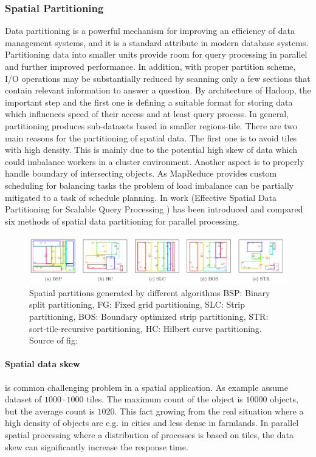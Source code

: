 \documentclass[a4paper,12pt,oneside]{report}
\begin{document}
		\subsubsection{Spatial Partitioning}
		\label{Spatial_Data_Partitioning}
Data partitioning is a powerful mechanism for improving an efficiency of data management systems, 
and it is a standard attribute in modern database systems. Partitioning data into smaller units provide room for query processing in parallel and further improved performance. In addition,
with proper partition scheme, I/O operations may be substantially
reduced by scanning only a few sections that contain relevant information to answer a question.
By architecture of Hadoop, the important step and the first one is defining a suitable format for 
storing data which influences  speed of their access and at least query process. In general,
partitioning produces sub-datasets based in smaller regions-tile.
There are two main reasons for the partitioning of spatial data. 
The first one is to avoid tiles with high density. This is mainly due to the potential high 
skew\cite{spatial_skew} of data which could imbalance workers in a cluster environment. Another aspect is to  
properly handle boundary of intersecting objects. As MapReduce provides custom
scheduling  for balancing tasks the problem of load imbalance can be partially 
mitigated to a task of schedule planning. In work (Effective Spatial Data Partitioning for Scalable Query 
Processing \cite{partitioning}) has been introduced and compared six methods of spatial data partitioning for parallel processing. 

\begin{figure}[h!]
    \centering
    \includegraphics[width=1\textwidth]{./img/part_overview.png}
    \caption[mapreduce flow]{\centering  Spatial partitions generated by different algorithms BSP: Binary split 
    partitioning, FG: Fixed grid
partitioning, SLC: Strip partitioning, BOS: Boundary optimized strip partitioning, STR: sort-tile-recursive
partitioning, HC: Hilbert curve partitioning. Source of fig: \cite{partitioning}}
 \end{figure} 

\paragraph{Spatial data skew} is common challenging problem in a spatial application. As example \cite{hadoopGIS} assume dataset of 
$1000\cdot1000$ tiles. The maximum count of the object is $10 000$ objects, but the average count is $1020$. This 
fact growing from the real situation where a high density of objects are e.g. in cities and less dense in farmlands. 
In parallel spatial processing where a distribution of processes is based on tiles, the data skew can significantly 
increase the response time.
\end{document}
